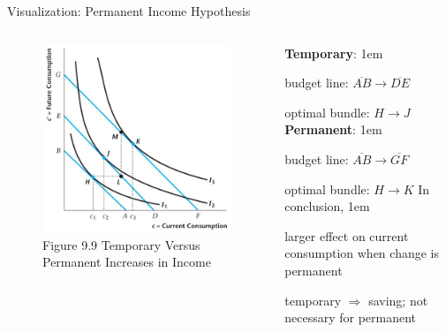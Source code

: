 \documentclass[11pt,aspectratio=43]{beamer}
\let\olditemize=\itemize
\let\endolditemize=\enditemize
\renewenvironment{itemize}{\olditemize \itemsep1em}{\endolditemize}
\theoremstyle{definition}
\begin{document}
\begin{frame}{Visualization: Permanent Income Hypothesis}
\label{slide:Visualization__Permanent_Income_Hypothesis}
    \begin{columns}
        \begin{column}{0.5\textwidth}
            \begin{figure}
                \caption{\scriptsize Figure 9.9  Temporary Versus Permanent Increases in Income}
                \includegraphics[width=\textwidth]{./figures/Figure9_9.jpg}
            \end{figure}
        \end{column}
        \begin{column}{0.5\textwidth}
            \textbf{Temporary}:
            \begin{itemize}
                \item budget line: $ \overline{AB} \rightarrow \overline{DE} $
                \item optimal bundle: $ H \rightarrow J $
            \end{itemize}
            \textbf{Permanent}:
            \begin{itemize}
                \item budget line: $ \overline{AB} \rightarrow \overline{GF} $
                \item optimal bundle: $ H \rightarrow K $
            \end{itemize}
            In conclusion,
            \begin{itemize}
                \item larger effect on current consumption when change is permanent
                \item temporary $ \Rightarrow  $ saving; not necessary for permanent
            \end{itemize}
        \end{column}
    \end{columns}
\end{frame}
\end{document}
